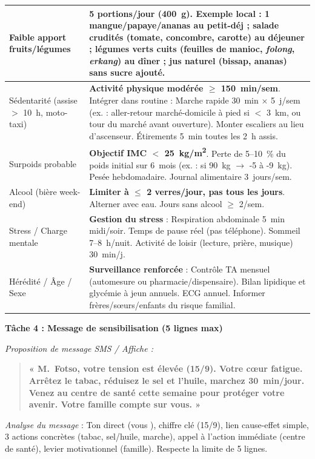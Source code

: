 \documentclass[11pt]{article}
\begin{document}
\begin{exoresolu}
\begin{center}
\begin{tabularx}{\linewidth}{|l|X|}
Faible apport fruits/légumes & \textbf{5 portions/jour} (\SI{400}{g}). Exemple local : 1 mangue/papaye/ananas au petit-déj ; salade crudités (tomate, concombre, carotte) au déjeuner ; légumes verts cuits (feuilles de manioc, \emph{folong}, \emph{erkang}) au dîner ; jus naturel (bissap, ananas) sans sucre ajouté. \\ \hline
Sédentarité (assise $>$ 10~h, moto-taxi) & \textbf{Activité physique modérée $\ge$ \SI{150}{min/sem}}. Intégrer dans routine : Marche rapide \SI{30}{min} $\times$ 5~j/sem (ex. : aller-retour marché-domicile à pied si $<$ \SI{3}{km}, ou tour du marché avant ouverture). Monter escaliers au lieu d'ascenseur. Étirements \SI{5}{min} toutes les 2~h assis. \\ \hline
Surpoids probable & \textbf{Objectif IMC $<$ \SI{25}{kg/m^2}}. Perte de 5--10~\% du poids initial sur 6~mois (ex. : si \SI{90}{kg} $\rightarrow$ -5 à -9~kg). Pesée hebdomadaire. Journal alimentaire 3~jours/sem. \\ \hline
Alcool (bière week-end) & \textbf{Limiter à $\le$ 2 verres/jour, pas tous les jours}. Alterner avec eau. Jours sans alcool $\ge$ 2/sem. \\ \hline
Stress / Charge mentale & \textbf{Gestion du stress} : Respiration abdominale \SI{5}{min} midi/soir. Temps de pause réel (pas téléphone). Sommeil 7--8~h/nuit. Activité de loisir (lecture, prière, musique) \SI{30}{min/j}. \\ \hline
Hérédité / Âge / Sexe & \textbf{Surveillance renforcée} : Contrôle TA mensuel (automesure ou pharmacie/dispensaire). Bilan lipidique et glycémie à jeun annuels. ECG annuel. Informer frères/sœurs/enfants du risque familial. \\ \hline
\end{tabularx}
\end{center}

\vspace{0.5cm}
\textbf{Tâche 4 : Message de sensibilisation (5 lignes max)}

\textit{Proposition de message SMS / Affiche :}

\begin{quote}
\textbf{« M.~Fotso, votre tension est élevée (15/9). Votre cœur fatigue. Arrêtez le tabac, réduisez le sel et l'huile, marchez 30~min/jour. Venez au centre de santé cette semaine pour protéger votre avenir. Votre famille compte sur vous. »}
\end{quote}

\textit{Analyse du message} : Ton direct (\og vous \fg), chiffre clé (15/9), lien cause-effet simple, 3 actions concrètes (tabac, sel/huile, marche), appel à l'action immédiate (centre de santé), levier motivationnel (famille). Respecte la limite de 5 lignes.
\end{exoresolu}
\end{document}
